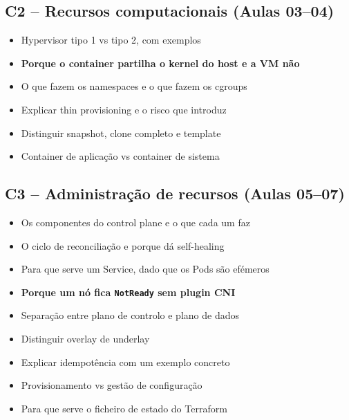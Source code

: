 \documentclass[11pt,a4paper]{article}
\begin{document}
\subsection*{C2 -- Recursos computacionais (Aulas 03--04)}
\begin{itemize}
  \item[$\square$] Hypervisor tipo 1 vs tipo 2, com exemplos
  \item[$\square$] \textbf{Porque o container partilha o kernel do host e a VM não}
  \item[$\square$] O que fazem os namespaces e o que fazem os cgroups
  \item[$\square$] Explicar thin provisioning e o risco que introduz
  \item[$\square$] Distinguir snapshot, clone completo e template
  \item[$\square$] Container de aplicação vs container de sistema
\end{itemize}

\subsection*{C3 -- Administração de recursos (Aulas 05--07)}
\begin{itemize}
  \item[$\square$] Os componentes do control plane e o que cada um faz
  \item[$\square$] O ciclo de reconciliação e porque dá self-healing
  \item[$\square$] Para que serve um Service, dado que os Pods são efémeros
  \item[$\square$] \textbf{Porque um nó fica \texttt{NotReady} sem plugin CNI}
  \item[$\square$] Separação entre plano de controlo e plano de dados
  \item[$\square$] Distinguir overlay de underlay
  \item[$\square$] Explicar idempotência com um exemplo concreto
  \item[$\square$] Provisionamento vs gestão de configuração
  \item[$\square$] Para que serve o ficheiro de estado do Terraform
\end{itemize}
\end{document}
